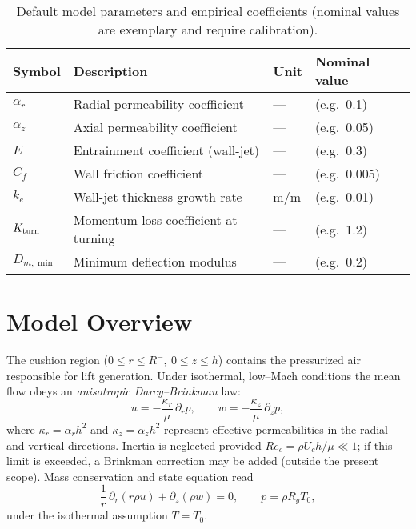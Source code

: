 \documentclass[11pt,a4paper]{article}
\begin{document}
\begin{table}[ht]
  \centering
  \caption{Default model parameters and empirical coefficients (nominal values are exemplary and require calibration).}
  \label{tab:model-params}
  \begin{tabular}{@{}llll@{}}
    \toprule
    Symbol & Description & Unit & Nominal value \\
    \midrule
    $\alpha_r$     & Radial permeability coefficient      & —     & (e.g.\ 0.1) \\
    $\alpha_z$     & Axial permeability coefficient       & —     & (e.g.\ 0.05) \\
    $E$            & Entrainment coefficient (wall-jet)  & —     & (e.g.\ 0.3) \\
    $C_f$          & Wall friction coefficient           & —     & (e.g.\ 0.005) \\
    $k_e$          & Wall-jet thickness growth rate      & m/m   & (e.g.\ 0.01) \\
    $K_{\rm turn}$ & Momentum loss coefficient at turning& —     & (e.g.\ 1.2) \\
    $D_{m,\min}$   & Minimum deflection modulus         & —     & (e.g.\ 0.2) \\
    \bottomrule
  \end{tabular}
\end{table}


\section{Model Overview}
\label{sec:model-overview}

The cushion region ($0\le r\le R^{-},\ 0\le z\le h$) contains the pressurized air responsible for lift generation.
Under isothermal, low–Mach conditions the mean flow obeys an \emph{anisotropic Darcy–Brinkman} law:
\begin{equation}
  u = -\frac{\kappa_r}{\mu}\,\partial_r p , \qquad
  w = -\frac{\kappa_z}{\mu}\,\partial_z p ,
  \label{eq:darcy_brinkman}
\end{equation}
where $\kappa_r=\alpha_r h^2$ and $\kappa_z=\alpha_z h^2$ represent effective permeabilities in the radial and vertical directions.
Inertia is neglected provided $Re_c=\rho U_c h/\mu\ll 1$; if this limit is exceeded, a Brinkman correction may be added (outside the present scope).
Mass conservation and state equation read
\begin{equation}
  \frac{1}{r}\,\partial_r\!\left(r\rho u\right)+\partial_z(\rho w)=0,
  \qquad
  p=\rho R_g T_0,
\end{equation}
under the isothermal assumption $T=T_0$.
\end{document}
